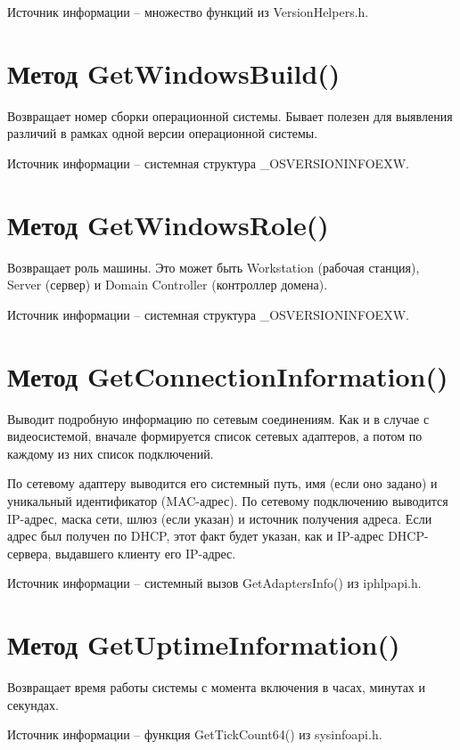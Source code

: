 \documentclass[a4paper, 12pt]{report}		%
\begin{document}
Источник информации -- множество функций из VersionHelpers.h.

\section*{Метод GetWindowsBuild()}
Возвращает номер сборки операционной системы. Бывает полезен для выявления различий в рамках одной версии операционной системы.

Источник информации -- системная структура \_OSVERSIONINFOEXW.

\section*{Метод GetWindowsRole()}
Возвращает роль машины. Это может быть Workstation (рабочая станция), Server (сервер) и Domain Controller (контроллер домена).

Источник информации -- системная структура \_OSVERSIONINFOEXW.

\section*{Метод GetConnectionInformation()}
Выводит подробную информацию по сетевым соединениям. Как и в случае с видеосистемой, вначале формируется список сетевых адаптеров, а потом по каждому из них список подключений.

По сетевому адаптеру выводится его системный путь, имя (если оно задано) и уникальный идентификатор (MAC-адрес). По сетевому подключению выводится IP-адрес, маска сети, шлюз (если указан) и источник получения адреса. Если адрес был получен по DHCP, этот факт будет указан, как и IP-адрес DHCP-сервера, выдавшего клиенту его IP-адрес.

Источник информации -- системный вызов GetAdaptersInfo() из iphlpapi.h.

\section*{Метод GetUptimeInformation()}
Возвращает время работы системы с момента включения в часах, минутах и секундах.

Источник информации -- функция GetTickCount64() из sysinfoapi.h.
\end{document}

